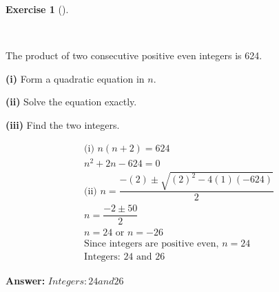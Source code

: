 \documentclass[
  letterpaper,
  DIV=11,
  numbers=noendperiod]{scrreprt}
\theoremstyle{definition}
\newtheorem{exercise}{Exercise}[chapter]
\theoremstyle{remark}
\begin{document}
\begin{exercise}[]\protect\hypertarget{exr-u6-25-1}{}\label{exr-u6-25-1}

~

The product of two consecutive positive even integers is 624.

\textbf{(i)} Form a quadratic equation in \(n\).

\textbf{(ii)} Solve the equation exactly.

\textbf{(iii)} Find the two integers.

\begin{tcolorbox}[enhanced jigsaw, opacitybacktitle=0.6, coltitle=black, arc=.35mm, colframe=quarto-callout-tip-color-frame, colback=white, bottomrule=.15mm, left=2mm, colbacktitle=quarto-callout-tip-color!10!white, titlerule=0mm, opacityback=0, title=\textcolor{quarto-callout-tip-color}{\faLightbulb}\hspace{0.5em}{🔍 View Solution}, leftrule=.75mm, breakable, rightrule=.15mm, bottomtitle=1mm, toptitle=1mm, toprule=.15mm]

\begin{align*}
\text{(i) } n(n+2) = 624 \\ n^2 + 2n - 624 = 0 \\ \text{(ii) } n = \dfrac{-(2) \pm \sqrt{(2)^2 - 4(1)(-624)}}{2} \\ n = \dfrac{-2 \pm 50}{2} \\ n = 24 \text{ or } n = -26 \\ \text{Since integers are positive even, } n = 24 \\ \text{Integers: } 24 \text{ and } 26
\end{align*}

\textbf{Answer:} \(Integers: 24 and 26\)

\end{tcolorbox}

\end{exercise}
\end{document}
